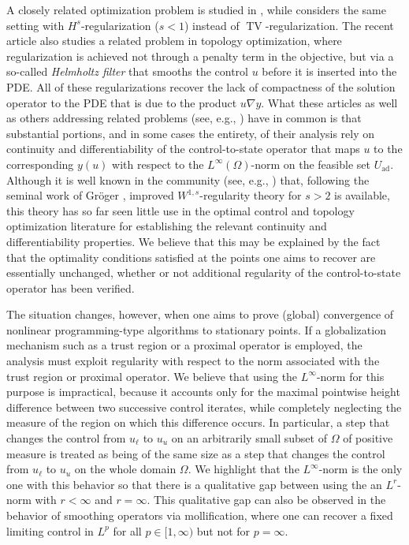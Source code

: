 \documentclass[11pt]{article}
\DeclareMathOperator*{\TV}{TV}
\newcommand{\feas}{U_{\textrm{ad}}}
\theoremstyle{definition}
\theoremstyle{remark}
\begin{document}
A closely related optimization problem is studied in \cite{clason2018total}, while \cite{assmann2013identification} considers the same setting with $H^s$-regularization 
($s < 1$) instead of $\TV$-regularization. 
The recent article \cite{antil2024uniform} 
also studies a related problem in topology optimization, where regularization is achieved not through a penalty term in the objective, but via a so-called \emph{Helmholtz filter}\cite{lazarov2011filters} that smooths the control $u$
before it is inserted into the PDE. 
 All of these regularizations recover the lack of compactness
of the solution operator to the PDE that is due to the product $u \nabla y$. What these
articles as well as others addressing related problems (see, e.g., \cite{garcke2022phase})
have in common is that substantial portions, and in some cases the entirety, of their analysis rely on continuity and differentiability of the control-to-state operator that maps $u$ to the
corresponding $y(u)$ with respect to the $L^\infty(\Omega)$-norm on the feasible set $\feas$.
Although it is well known in the community (see, e.g., \cite{clason2018total,clason2021optimal})
that, following the seminal work of Gröger \cite{groger1989aw}, 
improved $W^{1,s}$-regularity theory for $s > 2$ is available, this theory has so far seen little use in the optimal control and topology optimization literature for establishing the relevant continuity and differentiability properties.
We believe that this may be explained by the fact that the optimality conditions satisfied at the points one aims to recover are essentially unchanged, whether or not additional regularity of the control-to-state operator has been verified.


The situation changes, however, when one aims to prove (global) convergence of nonlinear programming-type algorithms to stationary points. If a globalization mechanism such as a trust region or a proximal operator is employed, the analysis must exploit regularity with respect to the norm associated with the trust region or proximal operator.
We believe that using the $L^\infty$-norm for this purpose is impractical, because it accounts only for the maximal pointwise height difference between two successive control iterates, while completely neglecting the measure of the region on which this difference occurs. In particular, a step that changes the control from $u_\ell$ to $u_u$
 on an arbitrarily small subset of $\Omega$ of positive measure is treated as being of the same size as a step that changes the control from $u_\ell$ to $u_u$
 on the whole domain $\Omega$. We highlight that the $L^\infty$-norm
is the only one with this behavior so that there is a qualitative gap between using the
an $L^r$-norm with $r < \infty$ and $r = \infty$. This qualitative gap can also be
observed in the behavior of smoothing operators via mollification, where one
can recover a fixed limiting control in $L^p$ for all $p \in [1,\infty)$
but not for $p = \infty$.
\end{document}
